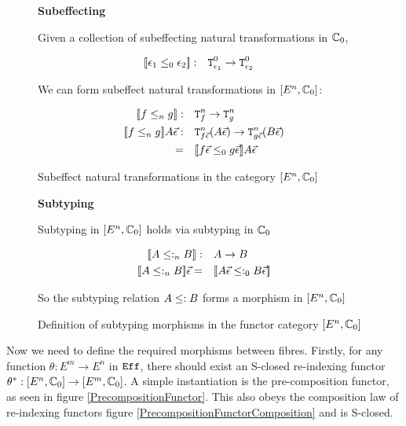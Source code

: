 \documentclass{Report}
\begin{document}
\begin{figure}
    \begin{framed}
        
        \centering\textbf{Subeffecting}


        Given a collection of subeffecting natural transformations in $\mathbb{C}_0$,
        
        \begin{align}
            {\bf [\![}\epsilon_1\leq_0 \epsilon_2{\bf ]\!]}:&\quad \texttt{T}^0_{\epsilon_1} \rightarrow \texttt{T}^0_{\epsilon_2}
        \end{align}
        
        We can form subeffect natural transformations in $[E^n, \mathbb{C}_0]$:
        
        \begin{align}
            {\bf [\![}f\leq_n g{\bf ]\!]}:&\quad\texttt{T}^n_{f}\rightarrow \texttt{T}^n_{g}\\
            {\bf [\![}f\leq_n g{\bf ]\!]} A \vec{\epsilon}:&\quad\texttt{T}^n_{f\vec{\epsilon}}(A\vec{\epsilon})\rightarrow \texttt{T}^n_{g\vec{\epsilon}}(B\vec{\epsilon})\\
            =&\quad {\bf [\![}f\vec{\epsilon}\leq_0 g\vec{\epsilon}{\bf ]\!]}A\vec{\epsilon}
        \end{align}
    \end{framed}
    \caption{Subeffect natural transformations in the category $[E^n, \mathbb{C}_0]$}
    \label{HowToBuildSubeffecting}
\end{figure}

\begin{figure}
    \begin{framed}
        
\centering\textbf{Subtyping}


Subtyping in $[E^n, \mathbb{C}_0]$ holds via subtyping in $\mathbb{C}_0$

\begin{align}
    {\bf [\![}A\leq:_n B{\bf ]\!]}:&\quad A\rightarrow B\\
    {\bf [\![}A\leq:_n B{\bf ]\!]}\vec{\epsilon}=&\quad {\bf [\![}A\vec{\epsilon}\leq:_0 B\vec{\epsilon}{\bf ]\!]}
\end{align}

So the subtyping relation $A \leq: B$ forms a morphism in $[E^n, \mathbb{C}_0]$

    \end{framed}
    \caption{Definition of subtyping morphisms in the functor category $[E^n, \mathbb{C}_0]$}
    \label{HowToBuildSubtyping}
\end{figure}

Now we need to define the required morphisms between fibres. Firstly, for any function $\theta: E^m \rightarrow E^n$ in $\texttt{Eff}$, there should exist an S-closed re-indexing functor $\theta^*: [E^n, \mathbb{C}_0] \rightarrow [E^m, \mathbb{C}_0]$. A simple instantiation is the pre-composition functor, as seen in figure \ref{PrecompositionFunctor}. This also obeys the composition law of re-indexing functors figure \ref{PrecompositionFunctorComposition} and is S-closed.
\end{document}
